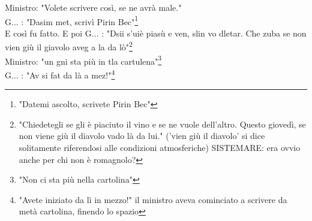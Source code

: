 \documentclass[10pt]{memoir} %
\begin{document}
Ministro: "Volete scrivere così, se ne avrà male."\\
G\:.\:.\:. : "Dasim met, scrivì Pirin Bec"\footnote{"Datemi ascolto, scrivete Pirin Bec"}\\
E così fu fatto. E poi G\:.\:.\:. : "Dsii s'uiè piasù e ven, slin vo dletar. Che zuba se non vien giù il giavolo aveg a la da lò"\footnote{"Chiedetegli se gli è piaciuto il vino e se ne vuole dell'altro. Questo giovedì, se non viene giù il diavolo vado là da lui." ('vien giù il diavolo' si dice solitamente riferendosi alle condizioni atmosferiche) SISTEMARE: era ovvio anche per chi non è romagnolo?}\\
Ministro: "un gni sta più in tla cartulena"\footnote{"Non ci sta più nella cartolina"}\\
G\:.\:.\:. : "Av si fat da là a mez!"\footnote{"Avete iniziato da lì in mezzo!" il ministro aveva cominciato a scrivere da metà cartolina, finendo lo spazio}

\end{document}
